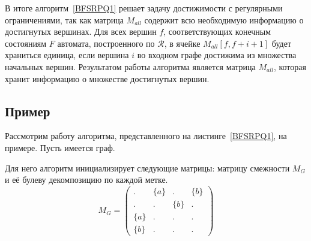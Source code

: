 В итоге алгоритм~\ref{BFSRPQ1} решает задачу достижимости с регулярными ограничениями, так как матрица $M_{all}$ содержит всю необходимую информацию о достигнутых вершинах. Для всех вершин $f$, соответствующих конечным состояниям $F$ автомата, построенного по $\mathcal{R}$, в ячейке $M_{all}[f, f + i + 1]$ будет храниться единица, если вершина $i$ во входном графе достижима из множества начальных вершин. Результатом работы алгоритма является матрица $M_{all}$, которая хранит информацию о множестве достигнутых вершин.

\subsection{Пример}

Рассмотрим работу алгоритма, представленного на листинге~\ref{BFSRPQ1}, на примере. Пусть имеется граф.
\begin{center}
  \label{input_rpq}
\end{center}

Для него алгоритм инициализирует следующие матрицы: матрицу смежности $M_G$ и её булеву декомпозицию по каждой метке.
\[ M_G =
  \begin{pmatrix}
    .     & \{a\} & .     & \{b\} \\
    .     & .     & \{b\} & .     \\
    \{a\} & .     & .     & .     \\
    \{b\} & .     & .     & .
  \end{pmatrix}
\]


